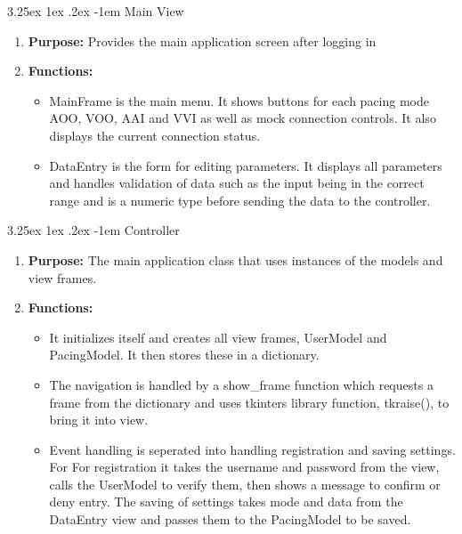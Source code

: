 \documentclass{article}
\makeatletter
\newcounter{subsubsubsection}[subsubsection]
\renewcommand\paragraph{\@startsection{paragraph}{5}{\z@}%
  {3.25ex \@plus1ex \@minus.2ex}%
  {-1em}%
  {\normalfont\normalsize\bfseries}}
\makeatother
\begin{document}
\paragraph{Main View}
\begin{enumerate}[label=]
    \item \textbf{Purpose:} Provides the main application screen after logging in
    \item \textbf{Functions:} 
    \begin{itemize}
        \item MainFrame is the main menu. It shows buttons for each pacing mode AOO, VOO, AAI and VVI as well 
        as mock connection controls. It also displays the current connection status.
        \item DataEntry is the form for editing parameters. It displays all parameters and handles validation 
        of data such as the input being in the correct range and is a numeric type before sending the data to the controller.
    \end{itemize}
\end{enumerate}


\paragraph{Controller}
\begin{enumerate}[label=]
    \item \textbf{Purpose:} The main application class that uses instances of the models and view frames. 
    \item \textbf{Functions:} 
    \begin{itemize}
        \item It initializes itself and creates all view frames, UserModel and PacingModel. It then stores these in a dictionary. 
        \item The navigation is handled by a show\_frame function which requests a frame from the dictionary 
        and uses tkinters library function, tkraise(), to bring it into view. 
        \item Event handling is seperated into handling registration and saving settings. For 
        For registration it takes the username and password from the view, calls the UserModel to verify them, 
        then shows a message to confirm or deny entry. The saving of settings takes mode and data from the DataEntry view 
        and passes them to the PacingModel to be saved. 
    \end{itemize}
\end{enumerate}
\end{document}
